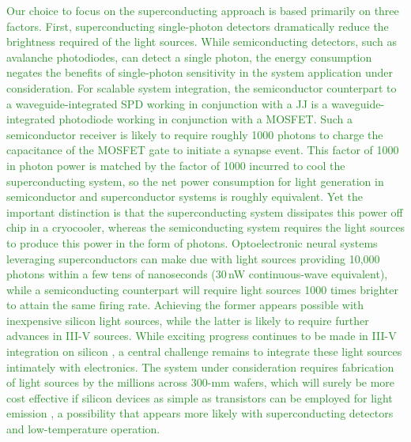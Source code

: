 \documentclass[twocolumn]{article}
\begin{document}
\textcolor{ForestGreen}{Our choice to focus on the superconducting approach is based primarily on three factors. First, superconducting single-photon detectors dramatically reduce the brightness required of the light sources. While semiconducting detectors, such as avalanche photodiodes, can detect a single photon, the energy consumption negates the benefits of single-photon sensitivity in the system application under consideration. For scalable system integration, the semiconductor counterpart to a waveguide-integrated SPD working in conjunction with a JJ is a waveguide-integrated photodiode working in conjunction with a MOSFET. Such a semiconductor receiver is likely to require roughly 1000 photons to charge the capacitance of the MOSFET gate \cite{mi2017} to initiate a synapse event. This factor of 1000 in photon power is matched by the factor of 1000 incurred to cool the superconducting system, so the net power consumption for light generation in semiconductor and superconductor systems is roughly equivalent. Yet the important distinction is that the superconducting system dissipates this power off chip in a cryocooler, whereas the semiconducting system requires the light sources to produce this power in the form of photons. Optoelectronic neural systems leveraging superconductors can make due with light sources providing 10,000 photons within a few tens of nanoseconds (30\,nW continuous-wave equivalent), while a semiconducting counterpart will require light sources 1000 times brighter to attain the same firing rate. Achieving the former appears possible with inexpensive silicon light sources, while the latter is likely to require further advances in III-V sources. While exciting progress continues to be made in III-V integration on silicon \cite{tapa2019,hala2020}, a central challenge remains to integrate these light sources intimately with electronics. The system under consideration requires fabrication of light sources by the millions across 300-mm wafers, which will surely be more cost effective if silicon devices as simple as transistors can be employed for light emission \cite{buch2017}, a possibility that appears more likely with superconducting detectors and low-temperature operation.}
\end{document}
